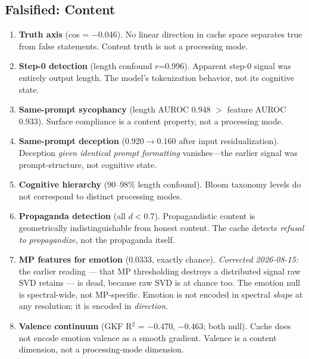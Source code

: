 \documentclass[11pt,letterpaper]{article}
\begin{document}
\subsection{Falsified: Content}

\begin{enumerate}[nosep]

\item \textbf{Truth axis} (cos = $-$0.046). No linear direction in
cache space separates true from false statements. Content truth is not
a processing mode.

\item \textbf{Step-0 detection} (length confound $r$=0.996). Apparent
step-0 signal was entirely output length. The model's tokenization
behavior, not its cognitive state.

\item \textbf{Same-prompt sycophancy} (length AUROC 0.948 $>$ feature
AUROC 0.933). Surface compliance is a content property, not a
processing mode.

\item \textbf{Same-prompt deception} (0.920$\to$0.160 after input
residualization). Deception \emph{given identical prompt formatting}
vanishes---the earlier signal was prompt-structure, not cognitive state.

\item \textbf{Cognitive hierarchy} (90--98\% length confound). Bloom
taxonomy levels do not correspond to distinct processing modes.

\item \textbf{Propaganda detection} (all $d<$0.7). Propagandistic
content is geometrically indistinguishable from honest content. The
cache detects \emph{refusal to propagandize}, not the propaganda
itself.

\item \textbf{MP features for emotion} (0.0333, exactly chance).
\emph{Corrected 2026-08-15:} the earlier reading --- that MP thresholding destroys a
distributed signal raw SVD retains --- is dead, because raw SVD is at chance too. The
emotion null is spectral-wide, not MP-specific. Emotion is not encoded in spectral
\emph{shape} at any resolution; it is encoded in \emph{direction}.

\item \textbf{Valence continuum} (GKF R$^2$ = $-$0.470, $-$0.463;
both null). Cache does not encode emotion valence as a smooth gradient.
Valence is a content dimension, not a processing-mode dimension.

\end{enumerate}
\end{document}
